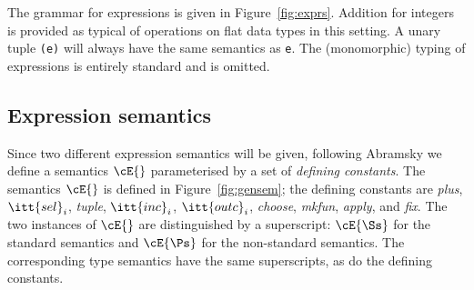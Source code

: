 The grammar for expressions is given in Figure~\ref{fig:exprs}.
Addition for integers is provided as typical of operations on flat data
types in this setting.  A unary tuple \mbox{\tt (e)} will always have the same
semantics as \mbox{\tt e}.  The (monomorphic) typing of expressions is entirely
standard and is omitted.


\subsection{Expression semantics}

Since two different expression semantics will be given, following
Abramsky \cite{Abr90} we define a semantics $\cE{}$ parameterised by a
set of {\it defining constants}.  The semantics $\cE{}$ is defined in
Figure~\ref{fig:gensem}; the defining constants are {\it
plus}, $\itt{sel}_i$, {\it tuple}, $\itt{inc}_i$, $\itt{outc}_i$, {\it
choose}, {\it mkfun}, {\it apply}, and {\it fix}.  The two instances of
$\cE{}$ are distinguished by a superscript:  $\cE{\Ss}$ for the
standard semantics and $\cE{\Ps}$ for the non-standard semantics.  The
corresponding type semantics have the same superscripts, as do the
defining constants.

